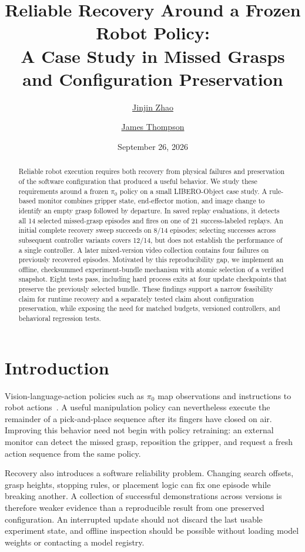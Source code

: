 \documentclass[10pt,twocolumn]{article}
\title{Reliable Recovery Around a Frozen Robot Policy:\\A Case Study in Missed Grasps and Configuration Preservation}
\author{\href{https://www.linkedin.com/in/jinjzhao}{Jinjin Zhao} \and
\href{https://www.linkedin.com/in/astrojams1}{James Thompson}}
\date{September 26, 2026}
\begin{document}
\maketitle
\begin{abstract}
Reliable robot execution requires both recovery from physical failures and preservation of the software configuration that produced a useful behavior. We study these requirements around a frozen $\pi_0$ policy on a small LIBERO-Object case study. A rule-based monitor combines gripper state, end-effector motion, and image change to identify an empty grasp followed by departure. In saved replay evaluations, it detects all 14 selected missed-grasp episodes and fires on one of 21 success-labeled replays. An initial complete recovery sweep succeeds on 8/14 episodes; selecting successes across subsequent controller variants covers 12/14, but does not establish the performance of a single controller. A later mixed-version video collection contains four failures on previously recovered episodes. Motivated by this reproducibility gap, we implement an offline, checksummed experiment-bundle mechanism with atomic selection of a verified snapshot. Eight tests pass, including hard process exits at four update checkpoints that preserve the previously selected bundle. These findings support a narrow feasibility claim for runtime recovery and a separately tested claim about configuration preservation, while exposing the need for matched budgets, versioned controllers, and behavioral regression tests.
\end{abstract}

\section{Introduction}
Vision-language-action policies such as $\pi_0$ map observations and instructions to robot actions~\cite{pi0}. A useful manipulation policy can nevertheless execute the remainder of a pick-and-place sequence after its fingers have closed on air. Improving this behavior need not begin with policy retraining: an external monitor can detect the missed grasp, reposition the gripper, and request a fresh action sequence from the same policy.

Recovery also introduces a software reliability problem. Changing search offsets, grasp heights, stopping rules, or placement logic can fix one episode while breaking another. A collection of successful demonstrations across versions is therefore weaker evidence than a reproducible result from one preserved configuration. An interrupted update should not discard the last usable experiment state, and offline inspection should be possible without loading model weights or contacting a model registry.
\end{document}
